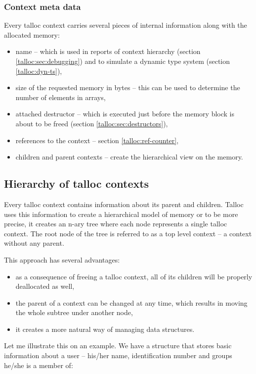 \subsubsection{Context meta data}
Every talloc context carries several pieces of internal information along with
the allocated memory:

\begin{itemize}
  \item name -- which is used in reports of context hierarchy (section
  \ref{talloc:sec:debugging}) and to simulate a dynamic type system (section
  \ref{talloc:dyn-ts}),
  \item size of the requested memory in bytes -- this can be used to determine
  the number of elements in arrays,
  \item attached destructor -- which is executed just before the memory block is
  about to be freed (section \ref{talloc:sec:destructors}),
  \item references to the context -- section \ref{talloc:ref-counter},
  \item children and parent contexts -- create the hierarchical view on the
  memory.
\end{itemize}

\subsection{Hierarchy of talloc contexts}

Every talloc context contains information about its parent and children. Talloc
uses this information to create a hierarchical model of memory or to be more
precise, it creates an n-ary tree where each node represents a single talloc
context. The root node of the tree is referred to as a top level context -- a
context without any parent.

This approach has several advantages:

\begin{itemize}
  \item as a consequence of freeing a talloc context, all of its children
  will be properly deallocated as well,
  \item the parent of a context can be changed at any time, which
  results in moving the whole subtree under another node,
  \item it creates a more natural way of managing data structures.
\end{itemize}

\noindent
Let me illustrate this on an example. We have a structure that stores basic
information about a user -- his/her name, identification number and groups
he/she is a member of:

